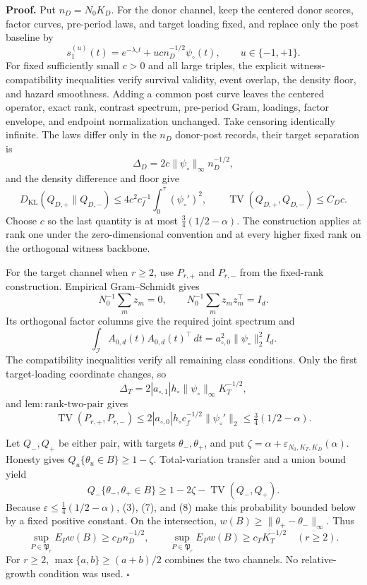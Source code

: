 \textbf{Proof.}
Put \(n_D=N_0K_D\). For the donor channel, keep the centered donor scores, factor curves, pre-period laws, and target loading fixed, and replace only the post baseline by
\[
 s_1^{(u)}(t)=e^{-\lambda_\circ t}+u c n_D^{-1/2}\psi_\circ(t),
 \qquad u\in\{-1,+1\}.                                  \tag{1}
\]
For fixed sufficiently small \(c>0\) and all large triples, the explicit witness-compatibility inequalities verify survival validity, event overlap, the density floor, and hazard smoothness. Adding a common post curve leaves the centered operator, exact rank, contrast spectrum, pre-period Gram, loadings, factor envelope, and endpoint normalization unchanged. Take censoring identically infinite. The laws differ only in the \(n_D\) donor-post records, their target separation is
\[
 \Delta_D=2c\|\psi_\circ\|_\infty n_D^{-1/2},           \tag{2}
\]
and the density difference and floor give
\[
 D_{\mathrm{KL}}(Q_{D,+}\|Q_{D,-})
 \le4c^2c_f^{-1}\int_0^{\bar\tau}(\psi_\circ')^2,
 \qquad \operatorname{TV}(Q_{D,+},Q_{D,-})\le C_Dc.     \tag{3}
\]
Choose \(c\) so the last quantity is at most \(\tfrac34(1/2-\alpha)\). The construction applies at rank one under the zero-dimensional convention and at every higher fixed rank on the orthogonal witness backbone.

For the target channel when \(r\ge2\), use \(P_{r,+}\) and \(P_{r,-}\) from the fixed-rank construction. Empirical Gram--Schmidt gives
\[
 N_0^{-1}\sum_mz_m=0,
 \qquad N_0^{-1}\sum_mz_mz_m^\top=I_d.                  \tag{4}
\]
Its orthogonal factor columns give the required joint spectrum and
\[
 \int_{\mathcal I}A_{0,d}(t)A_{0,d}(t)^\top\,dt
 =a_{\circ,0}^2\|\psi_\circ\|_2^2I_d.                   \tag{5}
\]
The compatibility inequalities verify all remaining class conditions. Only the first target-loading coordinate changes, so
\[
 \Delta_T=2|a_{\circ,1}|h_\circ\|\psi_\circ\|_\infty K_T^{-1/2}, \tag{6}
\]
and \(\mathrm{lem:rank\mbox{-}two\mbox{-}pair}\) gives
\[
 \operatorname{TV}(P_{r,+},P_{r,-})
 \le2|a_{\circ,0}|h_\circ c_f^{-1/2}\|\psi_\circ'\|_2
 \le\tfrac34(1/2-\alpha).                               \tag{7}
\]

Let \(Q_-,Q_+\) be either pair, with targets \(\theta_-,\theta_+\), and put \(\zeta=\alpha+\varepsilon_{N_0,K_T,K_D}(\alpha)\). Honesty gives \(Q_u\{\theta_u\in B\}\ge1-\zeta\). Total-variation transfer and a union bound yield
\[
 Q_-\{\theta_-,\theta_+\in B\}
 \ge1-2\zeta-\operatorname{TV}(Q_-,Q_+).                 \tag{8}
\]
Because \(\varepsilon\le\tfrac14(1/2-\alpha)\), (3), (7), and (8) make this probability bounded below by a fixed positive constant. On the intersection, \(w(B)\ge\|\theta_+-\theta_-\|_\infty\). Thus
\[
 \sup_{P\in\mathfrak P_r}E_Pw(B)\ge c_Dn_D^{-1/2},
 \qquad
 \sup_{P\in\mathfrak P_r}E_Pw(B)\ge c_TK_T^{-1/2}
 \quad(r\ge2).                                           \tag{9}
\]
For \(r\ge2\), \(\max\{a,b\}\ge(a+b)/2\) combines the two channels. No relative-growth condition was used. \(\square\)